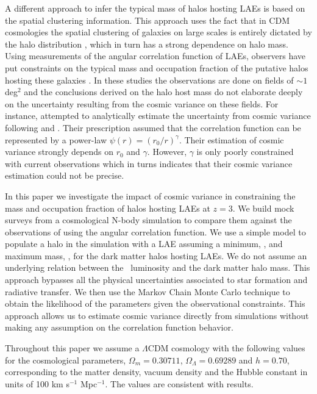 \documentclass{emulateapj}
\newcommand{\ly}{{\ifmmode{{\rm Ly}\alpha}\else{Ly$\alpha$}\fi}}
\newcommand{\mmin}{{\ifmmode{{M_{\rm min}}}\else{${M_{\rm min}}$}\fi}}
\newcommand{\mmax}{{\ifmmode{{M_{\rm max}}}\else{${M_{\rm max}}$}\fi}}
\begin{document}
A different approach to infer the typical mass of halos hosting
LAEs is based on the spatial clustering information. 
This approach uses the fact
that in CDM cosmologies the spatial clustering of galaxies on large
scales is entirely dictated by the halo distribution
\citep{Colberg00}, which in turn has a strong dependence on halo
mass. 
Using measurements of the angular correlation function of LAEs,
observers have put constraints on the typical mass and occupation
fraction of the putative halos hosting these galaxies
\citep{Hayashino2004,Gawiser07,Nilsson2007,Ouchi2010,Bielby16}. 
In these studies the observations are done on fields of $\sim 1$ deg$^{2}$ and
the conclusions derived on the halo host mass do not elaborate deeply on the
uncertainty resulting from the cosmic variance on these fields. 
For instance, \citet{Guaita2010} attempted to analytically 
estimate the uncertainty from cosmic variance 
following \citet{Somerville2004} and \citet{Peebles1980}. 
Their prescription assumed that the correlation function can be
represented by a power-law
$\psi\left(r\right)=\left(r_{0}/r\right)^{\gamma}$. 
Their estimation of cosmic variance strongly depends on $r_{0}$ and
$\gamma$.  
However, $\gamma$ is only poorly constrained with current
observations which in turns indicates that their cosmic variance
estimation could not be precise. 

In this paper we investigate the impact of cosmic variance in
constraining the mass and occupation fraction of halos hosting LAEs at $z=3$.
We build mock surveys from a cosmological N-body simulation to compare them
against the observations of \cite{Bielby16} using the angular
correlation function.  
We use a simple model to populate a halo in the simulation with a LAE   
assuming a minimum, \mmin, and maximum mass, \mmax, for the dark
matter halos hosting LAEs.  We do not  assume  an underlying relation 
between the \ly\  luminosity and the dark matter halo mass.  
This approach bypasses all the physical uncertainties associated to
star formation and radiative transfer. 
We then use the Markov Chain Monte Carlo technique to obtain the
likelihood of the parameters given the observational constraints.
This approach allows us to estimate cosmic variance directly from
simulations without making any assumption  on the correlation function
behavior. 

Throughout this paper we assume a $\Lambda$CDM cosmology with the
following values for the cosmological parameters, $\Omega_{m}=0.30711$,
$\Omega_{\Lambda}=0.69289$ and $h=0.70$, corresponding to the matter
density, vacuum density and the Hubble constant in units of 100 km
s$^{-1}$ Mpc$^{-1}$.  The values are consistent with \citet{Planck2014} results.
\end{document}
